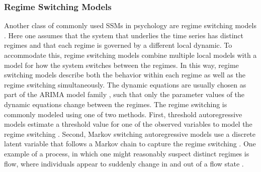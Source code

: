 \subsubsection{Regime Switching Models}

Another class of commonly used SSMs in psychology are regime switching models \parencite{hamaker_regime-switching_2010}.
Here one assumes that the system that underlies the time series has distinct regimes and that each 
regime is governed by a different local dynamic. To accommodate this, regime switching models 
combine multiple local models with a model for how the system switches between the regimes. 
In this way, regime switching models describe both the behavior within each regime as well as the regime switching simultaneously.
The dynamic equations are usually chosen as part of the ARIMA model family \parencite{box_time_1970}, such that only 
the parameter values of the dynamic equations change between the regimes. The regime switching is commonly modeled using 
one of two methods. First, threshold autoregressive models estimate a threshold value for one of the 
observed variables to model the regime switching \parencite{tong_threshold_1980}. 
Second, Markov switching autoregressive models use a discrete latent variable that follows a Markov chain 
to capture the regime switching \parencite{hamilton_new_1989}. One example of a process, 
in which one might reasonably suspect distinct regimes is flow, where individuals appear to
suddenly change in and out of a flow state \parencite{ceja_suddenly_2012}.
